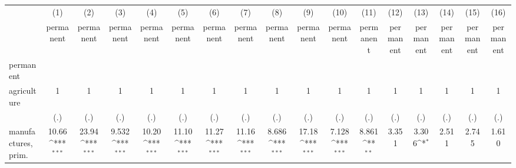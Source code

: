 {
\def\sym#1{\ifmmode^{#1}\else\(^{#1}\)\fi}
\begin{tabular}{l*{16}{c}}
\hline\hline
                    &\multicolumn{1}{c}{(1)}&\multicolumn{1}{c}{(2)}&\multicolumn{1}{c}{(3)}&\multicolumn{1}{c}{(4)}&\multicolumn{1}{c}{(5)}&\multicolumn{1}{c}{(6)}&\multicolumn{1}{c}{(7)}&\multicolumn{1}{c}{(8)}&\multicolumn{1}{c}{(9)}&\multicolumn{1}{c}{(10)}&\multicolumn{1}{c}{(11)}&\multicolumn{1}{c}{(12)}&\multicolumn{1}{c}{(13)}&\multicolumn{1}{c}{(14)}&\multicolumn{1}{c}{(15)}&\multicolumn{1}{c}{(16)}\\
                    &\multicolumn{1}{c}{permanent}&\multicolumn{1}{c}{permanent}&\multicolumn{1}{c}{permanent}&\multicolumn{1}{c}{permanent}&\multicolumn{1}{c}{permanent}&\multicolumn{1}{c}{permanent}&\multicolumn{1}{c}{permanent}&\multicolumn{1}{c}{permanent}&\multicolumn{1}{c}{permanent}&\multicolumn{1}{c}{permanent}&\multicolumn{1}{c}{permanent}&\multicolumn{1}{c}{permanent}&\multicolumn{1}{c}{permanent}&\multicolumn{1}{c}{permanent}&\multicolumn{1}{c}{permanent}&\multicolumn{1}{c}{permanent}\\
\hline
permanent           &                     &                     &                     &                     &                     &                     &                     &                     &                     &                     &                     &                     &                     &                     &                     &                     \\
agriculture         &           1         &           1         &           1         &           1         &           1         &           1         &           1         &           1         &           1         &           1         &           1         &           1         &           1         &           1         &           1         &           1         \\
                    &         (.)         &         (.)         &         (.)         &         (.)         &         (.)         &         (.)         &         (.)         &         (.)         &         (.)         &         (.)         &         (.)         &         (.)         &         (.)         &         (.)         &         (.)         &         (.)         \\
[1em]
manufactures, prim. &       10.66\sym{***}&       23.94\sym{***}&       9.532\sym{***}&       10.20\sym{***}&       11.10\sym{***}&       11.27\sym{***}&       11.16\sym{***}&       8.686\sym{***}&       17.18\sym{***}&       7.128\sym{***}&       8.861\sym{**} &       3.351         &       3.306\sym{*}  &       2.511         &       2.745         &       1.610         \\

\end{tabular}}
